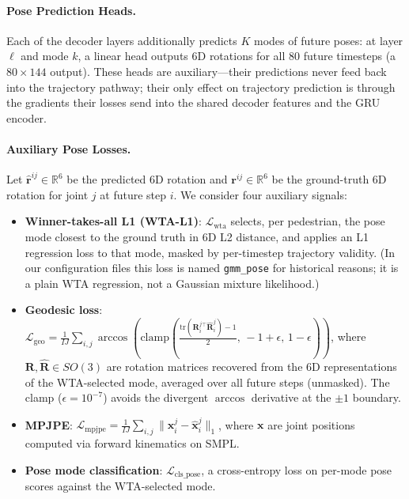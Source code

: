\documentclass{article} %
\begin{document}
\paragraph{Pose Prediction Heads.}
Each of the decoder layers additionally predicts $K$ modes of future poses:
at layer $\ell$ and mode $k$, a linear head outputs 6D rotations for all 80
future timesteps (a $80{\times}144$ output). These heads are auxiliary---their
predictions never feed back into the trajectory pathway; their only effect on
trajectory prediction is through the gradients their losses send into the shared
decoder features and the GRU encoder.

\paragraph{Auxiliary Pose Losses.}
Let $\hat{\mathbf{r}}^{ij} \in \mathbb{R}^6$ be the predicted 6D rotation and
$\mathbf{r}^{ij} \in \mathbb{R}^6$ be the ground-truth 6D rotation for joint $j$
at future step $i$. We consider four auxiliary signals:

\begin{itemize}
  \item \textbf{Winner-takes-all L1 (WTA-L1)}: $\mathcal{L}_{\text{wta}}$ selects,
        per pedestrian, the pose mode closest to the ground truth in 6D L2 distance,
        and applies an L1 regression loss to that mode, masked by per-timestep
        trajectory validity. (In our configuration files this loss is named
        \texttt{gmm\_pose} for historical reasons; it is a plain WTA regression,
        not a Gaussian mixture likelihood.)

  \item \textbf{Geodesic loss}: $\mathcal{L}_{\text{geo}} = \frac{1}{IJ}\sum_{i,j}
        \arccos\!\left(\text{clamp}\!\left(\frac{\text{tr}(\mathbf{R}_i^j{}^\top \hat{\mathbf{R}}_i^j) - 1}{2},\,-1{+}\epsilon,\,1{-}\epsilon\right)\right)$,
        where $\mathbf{R}, \hat{\mathbf{R}} \in SO(3)$ are rotation matrices
        recovered from the 6D representations of the WTA-selected mode, averaged
        over all future steps (unmasked). The clamp ($\epsilon{=}10^{-7}$) avoids the
        divergent $\arccos$ derivative at the $\pm1$ boundary.

  \item \textbf{MPJPE}: $\mathcal{L}_{\text{mpjpe}} = \frac{1}{IJ}\sum_{i,j}
        \|\mathbf{x}_i^j - \hat{\mathbf{x}}_i^j\|_1$, where $\mathbf{x}$ are joint
        positions computed via forward kinematics on SMPL.

  \item \textbf{Pose mode classification}: $\mathcal{L}_{\text{cls\_pose}}$,
        a cross-entropy loss on per-mode pose scores against the WTA-selected mode.
\end{itemize}
\end{document}

